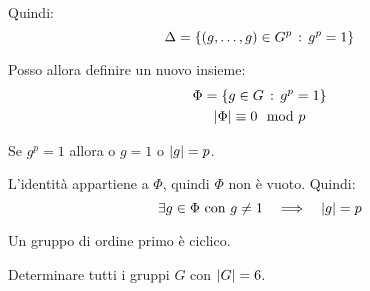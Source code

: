 \begin{dimostrazione}
    Quindi:
    \begin{equation*}
        \Delta = \{(g, \dots, g) \in G^p \,:\, g^p = 1\}
    \end{equation*}

    Posso allora definire un nuovo insieme:
    \begin{gather*}
        \Phi = \{g \in G \,:\, g^p = 1\} \\
        \lvert \Phi \rvert \equiv 0 \mod p
    \end{gather*}

    Se $g^p = 1$ allora o $g = 1$ o $\lvert g \rvert = p$.

    L'identità appartiene a $\Phi$, quindi $\Phi$ non è vuoto.
    Quindi:
    \begin{equation*}
        \exists g \in \Phi \text{ con } g \ne 1 \quad\Longrightarrow\quad \lvert g \rvert = p
    \end{equation*}

\end{dimostrazione}

\begin{corollario}
    \label{cor:gruppo_ordine_primo}
    Un gruppo di ordine primo è ciclico.
\end{corollario}

\begin{esercizio}
    Determinare tutti i gruppi $G$ con $\lvert G \rvert = 6$.
\end{esercizio}

